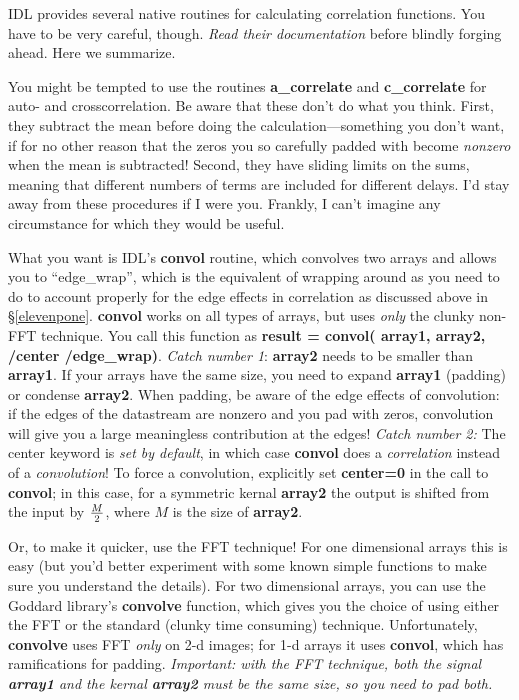 \documentclass[psfig,preprint]{aastex}
\begin{document}
	IDL provides several native routines for calculating correlation
functions. You have to be very careful, though. {\it Read their
documentation} before blindly forging ahead. Here we summarize.

	You might be tempted to use the routines {\bf a\_correlate} and
{\bf c\_correlate} for auto- and crosscorrelation. Be aware that these
don't do what you think. First, they subtract the mean before doing the
calculation---something you don't want, if for no other reason that the
zeros you so carefully padded with become {\it nonzero} when the mean is
subtracted! Second, they have sliding limits on the sums, meaning that
different numbers of terms are included for different delays. I'd stay
away from these procedures if I were you. Frankly, I can't imagine any
circumstance for which they would be useful.

	What you want is IDL's {\bf convol} routine, which convolves two
arrays and allows you to ``edge\_wrap'', which is the equivalent of
wrapping around as you need to do to account properly for the edge
effects in correlation as discussed above in \S \ref{elevenpone}. {\bf
convol} works on all types of arrays, but uses {\it only} the clunky
non-FFT technique. You call this function as {\bf result = convol(
array1, array2, /center /edge\_wrap)}. {\it Catch number 1}: {\bf
array2} needs to be smaller than {\bf array1}. If your arrays have the
same size, you need to expand {\bf array1} (padding) or condense {\bf
array2}. When padding, be aware of the edge effects of convolution: if
the edges of the datastream are nonzero and you pad with zeros,
convolution will give you a large meaningless contribution at the edges!
{\it Catch number 2:} The center keyword is {\it set by default}, in
which case {\bf convol} does a {\it correlation} instead of a {\it
convolution}! To force a convolution, explicitly set {\bf center=0} in
the call to {\bf convol}; in this case, for a symmetric kernal {\bf
array2} the output is shifted from the input by $M \over 2$, where $M$
is the size of {\bf array2}.

	Or, to make it quicker, use the FFT technique! For one
dimensional arrays this is easy (but you'd better experiment with some
known simple functions to make sure you understand the details). For two
dimensional arrays, you can use the Goddard library's {\bf convolve}
function, which gives you the choice of using either the FFT or the
standard (clunky time consuming) technique. Unfortunately,  {\bf
convolve} uses FFT {\it only} on 2-d images; for 1-d arrays it uses {\bf
convol}, which has ramifications for padding. {\it Important: with the
FFT technique, both the signal {\bf array1} and the kernal {\bf array2}
must be the same size, so you need to pad both.}
\end{document}
